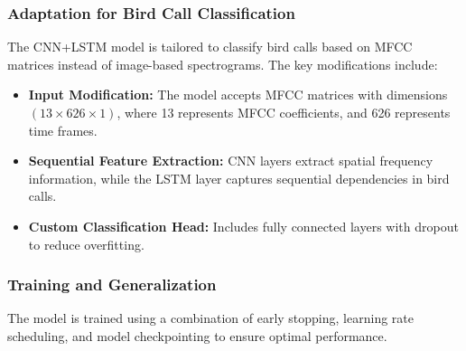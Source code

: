       \subsubsection{Adaptation for Bird Call Classification}
      The CNN+LSTM model is tailored to classify bird calls based on MFCC matrices instead of image-based spectrograms. The key modifications include:

      \begin{itemize}
      \item \textbf{Input Modification:} The model accepts MFCC matrices with dimensions $(13 \times 626 \times 1)$, where 13 represents MFCC coefficients, and 626 represents time frames.
      \item \textbf{Sequential Feature Extraction:} CNN layers extract spatial frequency information, while the LSTM layer captures sequential dependencies in bird calls.
      \item \textbf{Custom Classification Head:} Includes fully connected layers with dropout to reduce overfitting.
      \end{itemize}

      \subsubsection{Training and Generalization}
      The model is trained using a combination of early stopping, learning rate scheduling, and model checkpointing to ensure optimal performance.

